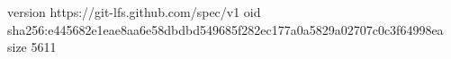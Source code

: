 version https://git-lfs.github.com/spec/v1
oid sha256:e445682e1eae8aa6e58dbdbd549685f282ec177a0a5829a02707c0c3f64998ea
size 5611
